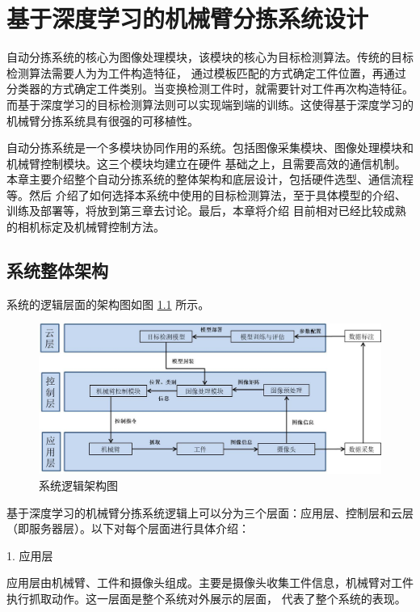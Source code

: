 
\chapter{基于深度学习的机械臂分拣系统设计}

自动分拣系统的核心为图像处理模块，该模块的核心为目标检测算法。传统的目标检测算法需要人为为工件构造特征，
通过模板匹配的方式确定工件位置，再通过分类器的方式确定工件类别。当变换检测工件时，就需要针对工件再次构造特征。
而基于深度学习的目标检测算法则可以实现端到端的训练。这使得基于深度学习的机械臂分拣系统具有很强的可移植性。

自动分拣系统是一个多模块协同作用的系统。包括图像采集模块、图像处理模块和机械臂控制模块。这三个模块均建立在硬件
基础之上，且需要高效的通信机制。本章主要介绍整个自动分拣系统的整体架构和底层设计，包括硬件选型、通信流程等。然后
介绍了如何选择本系统中使用的目标检测算法，至于具体模型的介绍、训练及部署等，将放到第三章去讨论。最后，本章将介绍
目前相对已经比较成熟的相机标定及机械臂控制方法。

\section{系统整体架构}

系统的逻辑层面的架构图如图    \ref{fig:total_construct}
所示。

\begin{figure}[htbp]
    \centering
    \includegraphics[width=\textwidth]{pic/chap2/total_construct.jpg}
    \caption{系统逻辑架构图}
    \label{fig:total_construct}
\end{figure}

基于深度学习的机械臂分拣系统逻辑上可以分为三个层面：应用层、控制层和云层（即服务器层）。以下对每个层面进行具体介绍：

1. 应用层

应用层由机械臂、工件和摄像头组成。主要是摄像头收集工件信息，机械臂对工件执行抓取动作。这一层面是整个系统对外展示的层面，
代表了整个系统的表现。

